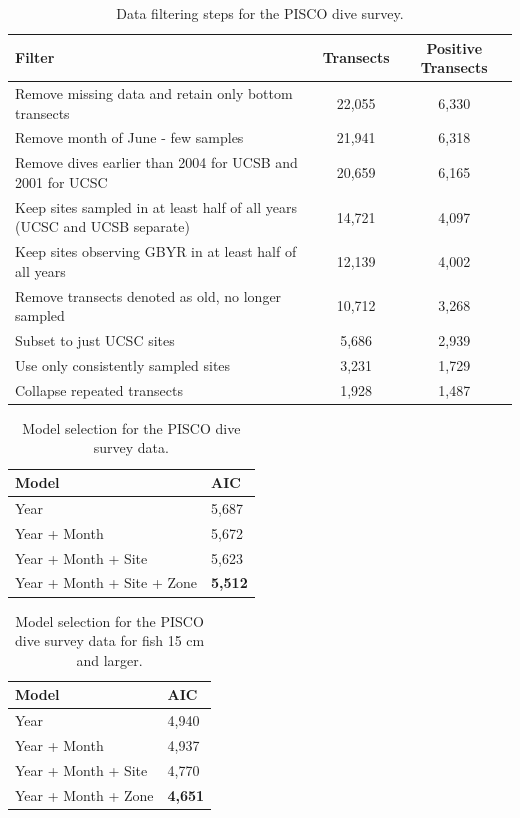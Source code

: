 \documentclass[12pt,]{article}
\begin{document}
\begin{table}[ht]
\centering
\caption{Data filtering steps for the PISCO dive survey.} 
\label{tab:Fleet8_Filter}
\begin{tabular}{>{\raggedright}p{4in}cc}
  \hline
Filter & Transects & Positive Transects \\ 
  \hline
Remove missing data and retain only bottom transects & 22,055 & 6,330 \\ 
  Remove month of  June - few samples & 21,941 & 6,318 \\ 
  Remove dives earlier than 2004 for UCSB and 2001 for UCSC & 20,659 & 6,165 \\ 
  Keep sites sampled in at least half of all years (UCSC and UCSB separate) & 14,721 & 4,097 \\ 
  Keep sites observing GBYR in at least half of all years & 12,139 & 4,002 \\ 
  Remove transects denoted as old, no longer sampled & 10,712 & 3,268 \\ 
  Subset to just UCSC sites & 5,686 & 2,939 \\ 
  Use only consistently sampled sites & 3,231 & 1,729 \\ 
  Collapse repeated transects & 1,928 & 1,487 \\ 
   \hline
\end{tabular}
\end{table}

\vspace{3cm}

\begin{table}[ht]
\centering
\caption{Model selection for the PISCO dive survey data.} 
\label{tab:Fleet8_AIC}
\begin{tabular}{ll}
  \hline
Model & AIC \\ 
  \hline
Year & 5,687 \\ 
  Year + Month & 5,672 \\ 
  Year + Month + Site & 5,623 \\ 
  Year + Month + Site + Zone & \textbf{5,512} \\ 
   \hline
\end{tabular}
\end{table}

\clearpage
\newpage

\vspace{3cm}

\begin{table}[ht]
\centering
\caption{Model selection for the PISCO dive survey data for fish 15 cm and larger.} 
\label{tab:Fleet8large_AIC}
\begin{tabular}{ll}
  \hline
Model & AIC \\ 
  \hline
Year & 4,940 \\ 
  Year + Month & 4,937 \\ 
  Year + Month + Site & 4,770 \\ 
  Year + Month + Zone & \textbf{4,651} \\ 
   \hline
\end{tabular}
\end{table}
\end{document}
